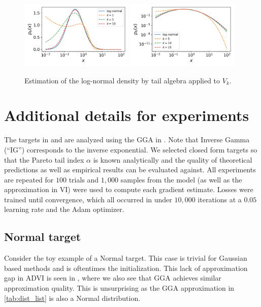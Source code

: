 \documentclass{article}
\theoremstyle{definition}
\begin{document}
\begin{figure}[h]
	\centering
	\includegraphics[width=0.48\textwidth]{figures/LogNormal_Bulk.png}
	\includegraphics[width=0.48\textwidth]{figures/LogNormal_Tail.png}
	\caption{Estimation of the log-normal density by tail algebra applied to $V_k$.}
	\label{fig:lognormal}
\end{figure}

\section{Additional details for experiments}



The targets in  and  are analyzed using
the GGA in . Note that Inverse Gamma (``IG'') corresponds
to the inverse exponential. We selected closed form targets so that
the Pareto tail index $\alpha$ is known analytically and the quality
of theoretical predictions as well as empirical results can be evaluated
against. All experiments are repeated for $100$ trials and $1,000$ samples
from the model (as well as the approximation in VI) were used to compute
each gradient estimate. Losses were trained until convergence, which 
all occurred in under $10,000$ iterations at a $0.05$ learning rate and
the Adam \citep{kingma2014adam} optimizer.



\subsection{Normal target}

Consider the toy example of a Normal target. This case is trivial for
Gaussian based methods and is oftentimes the initialization.
This lack of approximation gap in ADVI is seen in ,
where we also see that GGA achieves similar approximation quality.
This is unsurprising as the GGA approximation in \cref{tab:dist_list}
is also a Normal distribution.
\end{document}
